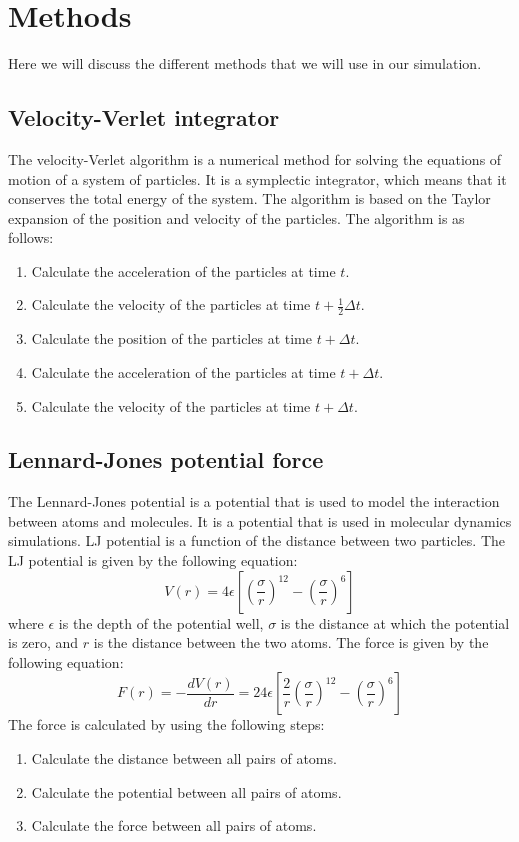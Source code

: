 \chapter{Methods}\label{chap:Methods}

Here we will discuss the different methods that we will use in our simulation.

\section{Velocity-Verlet integrator}
The velocity-Verlet algorithm is a numerical method for solving the equations of motion of a system of particles. It is a symplectic integrator, which means that it conserves the total energy of the system. The algorithm is based on the Taylor expansion of the position and velocity of the particles. The algorithm is as follows:
\begin{enumerate}
    \item Calculate the acceleration of the particles at time $t$.
    \item Calculate the velocity of the particles at time $t+\frac{1}{2}\Delta t$.
    \item Calculate the position of the particles at time $t+\Delta t$.
    \item Calculate the acceleration of the particles at time $t+\Delta t$.
    \item Calculate the velocity of the particles at time $t+\Delta t$.
\end{enumerate}


\section{Lennard-Jones potential force}
The Lennard-Jones potential is a potential that is used to model the interaction between atoms and molecules. It is a potential that is used in molecular dynamics simulations. LJ potential is a function of the distance between two particles. The LJ potential is given by the following equation:
\begin{equation}
    V(r) = 4\epsilon\left[\left(\frac{\sigma}{r}\right)^{12}-\left(\frac{\sigma}{r}\right)^6\right]
\end{equation}
where $\epsilon$ is the depth of the potential well, $\sigma$ is the distance at which the potential is zero, and $r$ is the distance between the two atoms. The force is given by the following equation:
\begin{equation}
    F(r) = -\frac{dV(r)}{dr} = 24\epsilon\left[\frac{2}{r}\left(\frac{\sigma}{r}\right)^{12}-\left(\frac{\sigma}{r}\right)^6\right]
\end{equation}
The force is calculated by using the following steps:
\begin{enumerate}
    \item Calculate the distance between all pairs of atoms.
    \item Calculate the potential between all pairs of atoms.
    \item Calculate the force between all pairs of atoms.
\end{enumerate}

